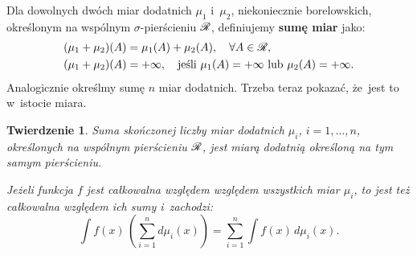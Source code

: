 \documentclass[a4paper,11pt]{article}
\numberwithin{equation}{section}
\newtheorem{theorem}{Twierdzenie}
\begin{document}
Dla dowolnych dwóch miar dodatnich $\mu_{ 1 }$ i~$\mu_{ 2 }$,
niekoniecznie borelowskich, określonym na wspólnym $\sigma$-pierścieniu $\mathcal{R}$, definiujemy \textbf{sumę miar} jako:
\begin{equation}
  \label{eq:RS-VolI-s0-01}
  \begin{split}
    ( \mu_{ 1 } + \mu_{ 2 } )( A )
    &=
      \mu_{ 1 }( A ) + \mu_{ 2 }( A ), \quad
      \forall A \in \mathcal{R}, \\
    ( \mu_{ 1 } + \mu_{ 2 } )( A )
    &= +\infty, \quad
      \textrm{jeśli } \mu_{ 1 }( A ) = +\infty \textrm{ lub }
      \mu_{ 2 }( A ) = +\infty.
  \end{split}
\end{equation}
Analogicznie określmy sumę $n$ miar dodatnich. Trzeba teraz pokazać,
że~jest to w~istocie miara.





\begin{theorem}

  Suma skończonej liczby miar dodatnich $\mu_{ i }$, $i = 1, \ldots, n$,
  określonych na wspólnym pierścieniu $\mathcal{R}$, jest miarą dodatnią
  określoną na tym samym pierścieniu.

  Jeżeli funkcja $f$ jest całkowalna względem względem wszystkich miar
  $\mu_{ i }$, to jest też całkowalna względem ich sumy i~zachodzi:
  \begin{equation}
    \label{eq:RS-Vol-I-s01-02}
    \int f( x ) \, \left( \sum\limits_{ i = 1 }^{ n } d\mu_{ i }( x ) \right)
    = \sum\limits_{ i = 1 }^{ n } \int f( x ) \, d\mu_{ i }( x ).
  \end{equation}

\end{theorem}
\end{document}
